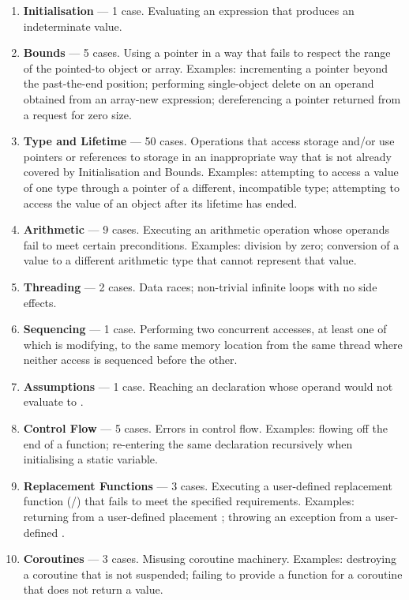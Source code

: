  \renewcommand{\labelenumi}{\Roman{enumi}.}
\begin{enumerate}
\item \textbf{Initialisation} --- 1 case. Evaluating an expression that produces an indeterminate value.
\item \textbf{Bounds} --- 5 cases. Using a pointer in a way that fails to respect the range of the pointed-to object or array. Examples: incrementing a pointer beyond the past-the-end position; performing single-object delete on an operand obtained from an array-new expression;  dereferencing a pointer returned from a request for zero size.
\item \textbf{Type and Lifetime} --- 50 cases. Operations that access storage and/or use pointers or references to storage in an inappropriate way that is not already covered by Initialisation and Bounds. Examples: attempting to access a value of one type through  a pointer of a different, incompatible type; attempting to access the value of an object after its lifetime has ended. 
\item \textbf{Arithmetic} --- 9 cases. Executing an arithmetic operation whose operands fail to meet certain preconditions. Examples: division by zero; conversion of a value to a different arithmetic type that cannot represent that value. 
\item \textbf{Threading} --- 2 cases. Data races; non-trivial infinite loops with no side effects.
\item \textbf{Sequencing} --- 1 case. Performing two concurrent accesses, at least one of which is modifying, to the same memory location from the same thread where neither access is sequenced before the other.
\item \textbf{Assumptions} --- 1 case. Reaching an \tcode{[[assume]]} declaration whose operand would not evaluate to .
\item \textbf{Control Flow} --- 5 cases. Errors in control flow. Examples: flowing off the end of a function; re-entering the same declaration recursively when initialising a static variable.
\item \textbf{Replacement Functions} --- 3 cases. Executing a user-defined replacement function (/) that fails to meet the specified requirements. Examples: returning  from a user-defined placement ; throwing an exception from a user-defined .
\item \textbf{Coroutines} --- 3 cases. Misusing coroutine machinery. Examples: destroying a coroutine that is not suspended; failing to provide a  function for a coroutine that does not return a value.
\end{enumerate}

